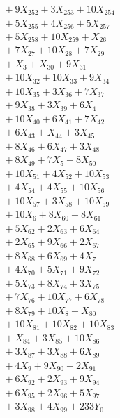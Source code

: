 \documentclass[a4paper,10pt]{article}
\begin{document}
{\begin{align}
&\quad  + 9X_{252} + 3X_{253} + 10X_{254} \\[0.5ex]
&\quad  + 5X_{255} + 4X_{256} + 5X_{257} \\[0.5ex]
&\quad  + 5X_{258} + 10X_{259} + X_{26} \\[0.5ex]
&\quad  + 7X_{27} + 10X_{28} + 7X_{29} \\[0.5ex]
&\quad  + X_{3} + X_{30} + 9X_{31} \\[0.5ex]
&\quad  + 10X_{32} + 10X_{33} + 9X_{34} \\[0.5ex]
&\quad  + 10X_{35} + 3X_{36} + 7X_{37} \\[0.5ex]
&\quad  + 9X_{38} + 3X_{39} + 6X_{4} \\[0.5ex]
&\quad  + 10X_{40} + 6X_{41} + 7X_{42} \\[0.5ex]
&\quad  + 6X_{43} + X_{44} + 3X_{45} \\[0.5ex]
&\quad  + 8X_{46} + 6X_{47} + 3X_{48} \\[0.5ex]
&\quad  + 8X_{49} + 7X_{5} + 8X_{50} \\[0.5ex]
&\quad  + 10X_{51} + 4X_{52} + 10X_{53} \\[0.5ex]
&\quad  + 4X_{54} + 4X_{55} + 10X_{56} \\[0.5ex]
&\quad  + 10X_{57} + 3X_{58} + 10X_{59} \\[0.5ex]
&\quad  + 10X_{6} + 8X_{60} + 8X_{61} \\[0.5ex]
&\quad  + 5X_{62} + 2X_{63} + 6X_{64} \\[0.5ex]
&\quad  + 2X_{65} + 9X_{66} + 2X_{67} \\[0.5ex]
&\quad  + 8X_{68} + 6X_{69} + 4X_{7} \\[0.5ex]
&\quad  + 4X_{70} + 5X_{71} + 9X_{72} \\[0.5ex]
&\quad  + 5X_{73} + 8X_{74} + 3X_{75} \\[0.5ex]
&\quad  + 7X_{76} + 10X_{77} + 6X_{78} \\[0.5ex]
&\quad  + 8X_{79} + 10X_{8} + X_{80} \\[0.5ex]
&\quad  + 10X_{81} + 10X_{82} + 10X_{83} \\[0.5ex]
&\quad  + X_{84} + 3X_{85} + 10X_{86} \\[0.5ex]
&\quad  + 3X_{87} + 3X_{88} + 6X_{89} \\[0.5ex]
&\quad  + 4X_{9} + 9X_{90} + 2X_{91} \\[0.5ex]
&\quad  + 6X_{92} + 2X_{93} + 9X_{94} \\[0.5ex]
&\quad  + 6X_{95} + 2X_{96} + 5X_{97} \\[0.5ex]
&\quad  + 3X_{98} + 4X_{99} + 233Y_{0} \\[0.5ex]

\end{align}}
\end{document}
